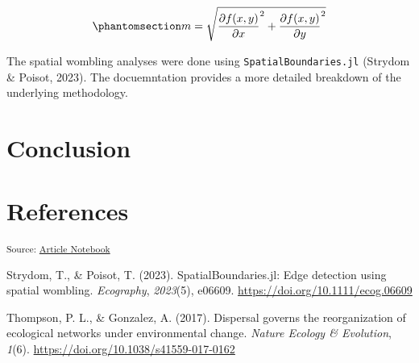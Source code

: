 \documentclass[
]{agujournal2019}
\newlength{\cslhangindent}
\newenvironment{CSLReferences}[2] %
 {\begin{list}{}{%
  \setlength{\itemindent}{0pt}
  \setlength{\leftmargin}{0pt}
  \setlength{\parsep}{0pt}
  \ifodd #1
   \setlength{\leftmargin}{\cslhangindent}
   \setlength{\itemindent}{-1\cslhangindent}
  \fi
  \setlength{\itemsep}{#2\baselineskip}}}
 {\end{list}}
\begin{document}
\begin{equation}\phantomsection\label{eq-womble}{
m = \sqrt{\frac{\partial f(x,y)}{\partial x}^2 + \frac{\partial f(x,y)}{\partial y}^2}
}\end{equation}

The spatial wombling analyses were done using
\texttt{SpatialBoundaries.jl} (Strydom \& Poisot, 2023). The
docuemntation provides a more detailed breakdown of the underlying
methodology.

\section{Conclusion}\label{conclusion}

\section*{References}\label{references}

\vspace{1em}

\textsubscript{Source:
\href{https://PoisotLab.github.io/ms_womble_ya_net/index.qmd.html}{Article
Notebook}}

\label{refs}
\begin{CSLReferences}{1}{0}
Strydom, T., \& Poisot, T. (2023). {SpatialBoundaries}.jl: Edge
detection using spatial wombling. \emph{Ecography}, \emph{2023}(5),
e06609. \url{https://doi.org/10.1111/ecog.06609}

Thompson, P. L., \& Gonzalez, A. (2017). Dispersal governs the
reorganization of ecological networks under environmental change.
\emph{Nature Ecology \& Evolution}, \emph{1}(6).
\url{https://doi.org/10.1038/s41559-017-0162}

\end{CSLReferences}
\end{document}
